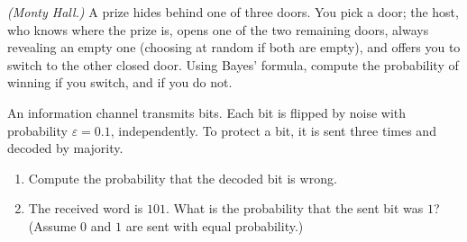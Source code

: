 \begin{exercise}[$\star\star\star$]\label{exo:tle:condprob:7}
\emph{(Monty Hall.)} A prize hides behind one of three doors. You pick a
door; the host, who knows where the prize is, opens one of the two
remaining doors, always revealing an empty one (choosing at random if both
are empty), and offers you to switch to the other closed door. Using
Bayes' formula, compute the probability of winning if you switch, and if
you do not.
\end{exercise}

\begin{exercise}[$\star\star\star$]\label{exo:tle:condprob:8}
An information channel transmits bits. Each bit is flipped by noise with
probability $\varepsilon = 0.1$, independently. To protect a bit, it is sent
three times and decoded by majority.
\begin{enumerate}
  \item Compute the probability that the decoded bit is wrong.
  \item The received word is $101$. What is the probability that the sent
        bit was $1$? (Assume $0$ and $1$ are sent with equal probability.)
\end{enumerate}
\end{exercise}
